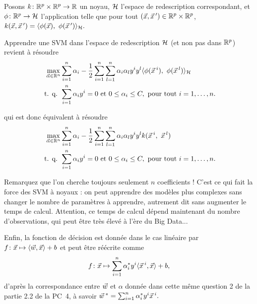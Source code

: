 Posons $k\colon \mathbb{R}^p \times \mathbb{R}^p \to \mathbb{R}$ un noyau, $\mathcal{H}$ l'espace de
redescription correspondant, et $\phi\colon \mathbb{R}^p \to \mathcal{H}$ l'application
telle que pour tout $(\xx, \xx^\prime) \in \RR^p \times \RR^p$, $k(\xx, \xx^\prime) = \innerproduct{\phi(\xx),~\phi(\xx^\prime)}_\HH.$

Apprendre une SVM dans l'espace de redescription $\mathcal{H}$ (et non pas dans $\mathbb{R}^p$) revient à résoudre 
\begin{align}
  \label{eq:soft-margin-dual-pb-featspace}
  \max_{\aalpha \in \RR^n} & 
                           \sum_{i=1}^n  \alpha_i- 
                           \frac{1}{2} \sum_{i=1}^n \sum_{l=1}^n \alpha_i \alpha_l y^i y^l \innerproduct{\phi(\xx^i),~\phi(\xx^l)}_\HH \\
  \nonumber \text{ t. q. } & \sum_{i=1}^n \alpha_i y^i = 0 \text{ et }  0 \leq \alpha_i
                             \leq C, \text{ pour tout } i=1, \dots, n.
\end{align}

qui est donc équivalent à résoudre
\begin{align}
  \label{eq:kernel-svm-dual-pb}
  \max_{\aalpha \in \RR^n} & 
                           \sum_{i=1}^n  \alpha_i- 
                           \frac{1}{2} \sum_{i=1}^n \sum_{l=1}^n \alpha_i \alpha_l y^i y^l k(\xx^i,~\xx^l) \\
  \nonumber \text{ t. q. } & \sum_{i=1}^n \alpha_i y^i = 0 \text{ et }  0 \leq \alpha_i
                             \leq C, \text{ pour tout } i=1, \dots, n.
\end{align}

Remarquez que l'on cherche toujours seulement $n$ coefficients ! C'est ce qui
fait la force des SVM à noyaux : on peut apprendre des modèles plus complexes
sans changer le nombre de paramètres à apprendre, autrement dit sans augmenter
le temps de calcul. Attention, ce temps de calcul dépend maintenant du nombre
d'observations, qui peut être très élevé à l'ère du Big Data...

Enfin, la fonction de décision est donnée dans le cas linéaire par
$  f\colon \xx \mapsto \innerproduct{\ww, \xx} + b$ et 
peut être réécrite comme 
\begin{equation*}
  f\colon \xx \mapsto \sum_{i=1}^n \alpha_i^* y^i \innerproduct{\xx^i, \xx} + b,
\end{equation*}
d'après la correspondance entre $\ww$ et $\alpha$ donnée dans cette même
question 2 de la partie 2.2 de la PC~4, à savoir
$\ww^* = \sum_{i=1}^n \alpha_i^* y^i \xx^i.$

